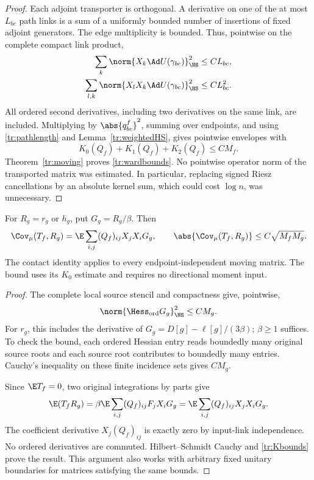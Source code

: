 \begin{proof}
Each adjoint transporter is orthogonal. A derivative on one of the at most
\(L_{bc}\) path links is a sum of a uniformly bounded number of insertions
of fixed adjoint generators. The edge multiplicity is bounded. Thus,
pointwise on the complete compact link product,
\begin{align*}
 \sum_k\norm{X_k\Ad U(\gamma_{bc})}_{\HS}^2&\le CL_{bc},\\
 \sum_{l,k}\norm{X_lX_k\Ad U(\gamma_{bc})}_{\HS}^2&\le CL_{bc}^2.
\end{align*}
All ordered second derivatives, including two derivatives on the same link,
are included. Multiplying by \(\abs{q^f_{bc}}^2\), summing over endpoints,
and using \eqref{tr:pathlength} and Lemma~\ref{tr:weightedHS}, gives
pointwise envelopes with
\begin{equation}
 K_0(Q_f)+K_1(Q_f)+K_2(Q_f)\le CM_f.
 \label{tr:Kbounds}
\end{equation}
Theorem~\ref{tr:moving} proves \eqref{tr:wardbounds}.
No pointwise operator norm of the transported matrix was estimated. In
particular, replacing signed Riesz cancellations by an absolute kernel sum,
which could cost \(\log n\), was unnecessary.
\end{proof}

\begin{proposition}
\label{tr:ordinarycontact}
For \(R_g=r_g\) or \(h_g\), put \(G_g=R_g/\beta\). Then
\begin{equation}
 \Cov_\mu(T_f,R_g)
   =\E\sum_{i,j}(Q_f)_{ij}X_jX_iG_g,
 \qquad
 \abs{\Cov_\mu(T_f,R_g)}\le C\sqrt{M_fM_g}.
 \label{tr:sourcecontact}
\end{equation}
The contact identity applies to every endpoint-independent moving matrix.
The bound uses its \(K_0\) estimate and requires no directional moment input.
\end{proposition}

\begin{proof}
The complete local source stencil and compactness give, pointwise,
\[
 \norm{\Hess_{\rm ord}G_g}_{\HS}^2\le CM_g.
\]
For \(r_g\), this includes the derivative of
\(G_g=D[g]-\ell[g]/(3\beta)\); \(\beta\ge1\) suffices. To check the bound,
each ordered Hessian entry reads boundedly many original source roots and
each source root contributes to boundedly many entries. Cauchy's inequality
on these finite incidence sets gives \(CM_g\).

Since \(\E T_f=0\), two original integrations by parts give
\[
 \E(T_fR_g)
 =\beta\E\sum_{i,j}(Q_f)_{ij}F_jX_iG_g
 =\E\sum_{i,j}(Q_f)_{ij}X_jX_iG_g.
\]
The coefficient derivative \(X_j(Q_f)_{ij}\) is exactly zero by input-link
independence. No ordered derivatives are commuted. Hilbert--Schmidt Cauchy
and \eqref{tr:Kbounds} prove the result. This argument also works with
arbitrary fixed unitary boundaries for matrices satisfying the same bounds.
\end{proof}
